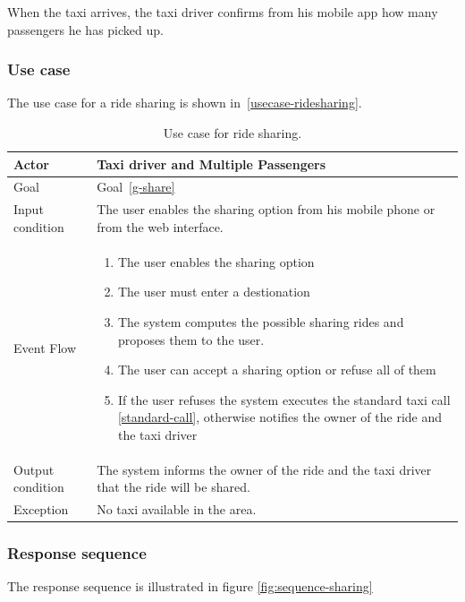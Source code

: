 When the taxi arrives, the taxi driver confirms from his mobile app how many passengers he has picked up.

\subsubsection{Use case}
The use case for a ride sharing is shown in~\autoref{usecase-ridesharing}.

\begin{table}
\begin{center}
\begin{tabular}{| l | p{} |}
\hline
Actor & Taxi driver and Multiple Passengers \\
\hline
Goal & Goal~\ref{g-share}
\\
\hline
Input condition & The user enables the sharing option from his mobile phone or from the web interface.  \\
\hline
Event Flow & \begin{enumerate}
	\item The user enables the sharing option
	\item The user must enter a destionation
	\item The system computes the possible sharing rides and proposes them to the user.
	\item The user can accept a sharing option or refuse all of them
	\item If the user refuses the system executes the standard taxi call \ref{standard-call}, otherwise notifies the owner of the ride and the taxi driver
	\end{enumerate}
\\
\hline
Output condition & The system informs the owner of the ride and the taxi driver that the ride will be shared. \\
\hline
Exception & No taxi available in the area. \\
\hline
\end{tabular}
\end{center}
\caption{Use case for ride sharing.}
\label{usecase-ridesharing}
\end{table}

\subsubsection{Response sequence}
The response sequence is illustrated in figure \ref{fig:sequence-sharing}

